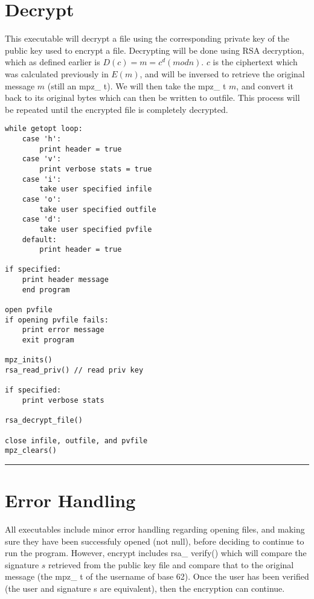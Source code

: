 \documentclass[
	12pt, %
]{fphw}
\begin{document}
\section{Decrypt}
This executable will decrypt a file using the corresponding private key of the public key used to encrypt a file. Decrypting will be done using RSA decryption, which as defined earlier is $D(c) = m = c^d (mod n)$. $c$ is the ciphertext which was calculated previously in $E(m)$, and will be inversed to retrieve the original message $m$ (still an mpz\_ t). We will then take the mpz\_ t $m$, and convert it back to its original bytes which can then be written to outfile. This process will be repeated until the encrypted file is completely decrypted.
\begin{lstlisting}[mathescape=true]
while getopt loop:
	case 'h':
		print header = true
	case 'v':
		print verbose stats = true
	case 'i':
		take user specified infile
	case 'o':
		take user specified outfile
	case 'd':
		take user specified pvfile
	default:
		print header = true
		
if specified:
	print header message
	end program
	
open pvfile
if opening pvfile fails:
	print error message
	exit program
	
mpz_inits()
rsa_read_priv() // read priv key

if specified:
	print verbose stats
	
rsa_decrypt_file()

close infile, outfile, and pvfile
mpz_clears()
\end{lstlisting}

\noindent\rule{6.3in}{0.4pt}

\section{Error Handling}
All executables include minor error handling regarding opening files, and making sure they have been successfuly opened (not null), before deciding to continue to run the program. However, encrypt includes rsa\_ verify() which will compare the signature $s$ retrieved from the public key file and compare that to the original message (the mpz\_ t of the username of base 62). Once the user has been verified (the user and signature s are equivalent), then the encryption can continue.
\end{document}
